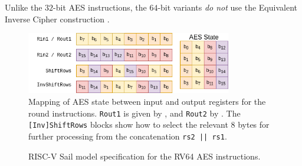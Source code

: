 Unlike the $32$-bit AES instructions, the $64$-bit variants
{\em do not} use the Equivalent Inverse Cipher
construction \cite[Section 5.3.5]{nist:fips:197}.

\begin{figure}[h]
\centering
\includegraphics[width=0.8\textwidth]{diagrams/aes-rv64-state.png}
\caption{
Mapping of AES state between input and output registers for the round
instructions.
{\tt Rout1} is given by ,
and
{\tt Rout2}          by .
The {\tt [Inv]ShiftRows} blocks show how to select the relevant $8$ bytes
for further processing from the concatenation {\tt rs2 || \tt rs1}.
}
\label{fig:aes:rv64:mapping}
\end{figure}

\begin{figure}[h!]

\caption{
RISC-V Sail model specification for the RV64 AES instructions.
}
\label{fig:pesudo:aes:rv64}
\end{figure}

